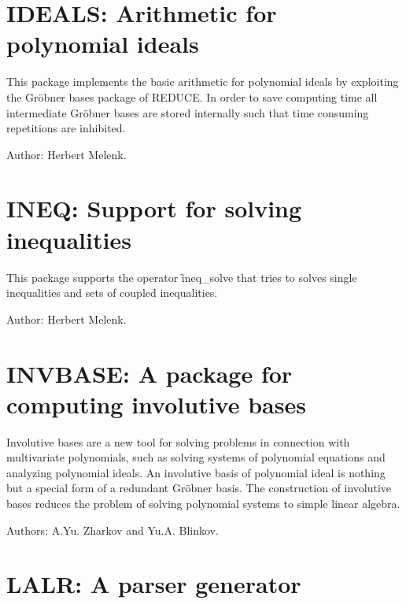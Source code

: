 

\newpage

\section{IDEALS: Arithmetic for polynomial ideals} 

This package implements the basic arithmetic for polynomial ideals by
exploiting the Gr\"obner bases package of REDUCE.  In order to save
computing time all intermediate Gr\"obner bases are stored internally such
that time consuming repetitions are inhibited.

Author: Herbert Melenk.



\newpage

\section{INEQ: Support for solving inequalities} 

This package supports the operator \f{ineq\_solve} that 
tries to solves single inequalities and sets of coupled inequalities.

Author: Herbert Melenk.



\newpage

\section{INVBASE: A package for computing involutive bases} 

Involutive bases are a new tool for solving problems in connection with
multivariate polynomials, such as solving systems of polynomial equations
and analyzing polynomial ideals.  An involutive basis of polynomial ideal
is nothing but a special form of a redundant Gr\"obner basis.  The
construction of involutive bases reduces the problem of solving polynomial
systems to simple linear algebra.

Authors: A.Yu. Zharkov and Yu.A. Blinkov.



\newpage

\section{LALR: A parser generator}

